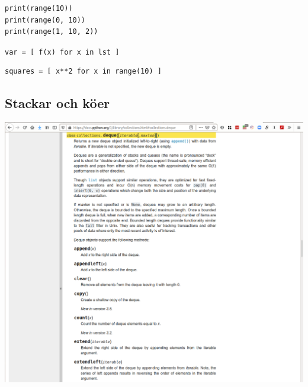 \begin{frame}[fragile]
  \begin{example}
    \begin{lstlisting}
print(range(10))
print(range(0, 10))
print(range(1, 10, 2))
    \end{lstlisting}
  \end{example}
\end{frame}


\begin{frame}[fragile]
  \lstinline[basicstyle=\huge]{var = [ f(x) for x in lst ]}
\end{frame}

\begin{frame}[fragile]
  \begin{example}
    \begin{lstlisting}
squares = [ x**2 for x in range(10) ]
    \end{lstlisting}
  \end{example}
\end{frame}


\subsection{Stackar och köer}

\begin{frame}[fragile]
  \begin{example}[pile.py]
    
  \end{example}
\end{frame}

\begin{frame}[fragile]
  \begin{example}[queue.py]
    
  \end{example}
\end{frame}

\begin{frame}
  \includegraphics[width=\columnwidth]{figs/docs-deque.png}
\end{frame}


